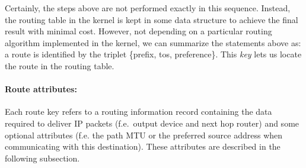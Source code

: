 Certainly, the steps above are not performed exactly
in this sequence. Instead, the routing table in the kernel is kept
in some data structure to achieve the final result
with minimal cost. However, not depending on a particular
routing algorithm implemented in the kernel, we can summarize
the statements above as: a route is identified by the triplet
\{prefix, tos, preference\}. This {\em key\/} lets us locate
the route in the routing table.

\paragraph{Route attributes:} Each route key refers to a routing
information record containing
the data required to deliver IP packets (f.e.\ output device and
next hop router) and some optional attributes (f.e. the path MTU or
the preferred source address when communicating with this destination).
These attributes are described in the following subsection.


